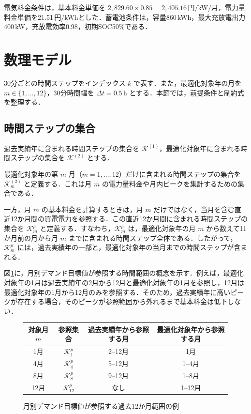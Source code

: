 \documentclass[a4paper,11pt,dvipdfmx]{jsarticle}
\begin{document}
電気料金条件は，基本料金単価を $2,829.60 \times 0.85 = 2,405.16$\,円/kW/月，電力量料金単価を21.51\,円/kWhとした．蓄電池条件は，容量860\,kWh，最大充放電出力400\,kW，充放電効率0.98，初期SOC50\%である．

\section{数理モデル}
30分ごとの時間ステップをインデックス $k$ で表す．また，最適化対象年の月を $m \in \{1,\dots,12\}$，30分時間幅を $\Delta t=0.5$\,h とする．本節では，前提条件と制約式を整理する．

\subsection{時間ステップの集合}
過去実績年に含まれる時間ステップの集合を $\mathcal{K}^{(1)}$，最適化対象年に含まれる時間ステップの集合を $\mathcal{K}^{(2)}$ とする．

最適化対象年の第 $m$ 月（$m=1,\dots,12$）だけに含まれる時間ステップの集合を $\mathcal{K}^{(2)}_{m}$ と定義する．これは月 $m$ の電力量料金や月内ピークを集計するための集合である．

一方，月 $m$ の基本料金を計算するときは，月 $m$ だけではなく，当月を含む直近12か月間の買電電力を参照する．この直近12か月間に含まれる時間ステップの集合を $\mathcal{K}^{p}_{m}$ と定義する．すなわち，$\mathcal{K}^{p}_{m}$ は，最適化対象年の月 $m$ から数えて11か月前の月から月 $m$ までに含まれる時間ステップ全体である．したがって，$\mathcal{K}^{p}_{m}$ には，過去実績年の一部と，最適化対象年の当月までの時間ステップが含まれる．

図\ref{fig:rolling_12months}に，月別デマンド目標値が参照する時間範囲の概念を示す．例えば，最適化対象年の1月は過去実績年の2月から12月と最適化対象年の1月を参照し，12月は最適化対象年の1月から12月のみを参照する．そのため，過去実績年に高いピークが存在する場合，そのピークが参照範囲から外れるまで基本料金は低下しない．

\begin{figure}[H]
    \centering
    \begin{tabular}{cccc}
        \toprule
        対象月 $m$ & 参照集合                   & 過去実績年から参照する月 & 最適化対象年から参照する月 \\
        \midrule
        1月      & $\mathcal{K}^{p}_{1}$  & 2--12月       & 1月            \\
        4月      & $\mathcal{K}^{p}_{4}$  & 5--12月       & 1--4月         \\
        8月      & $\mathcal{K}^{p}_{8}$  & 9--12月       & 1--8月         \\
        12月     & $\mathcal{K}^{p}_{12}$ & なし           & 1--12月        \\
        \bottomrule
    \end{tabular}
    \caption{月別デマンド目標値が参照する過去12か月範囲の例}
    \label{fig:rolling_12months}
\end{figure}
\end{document}
